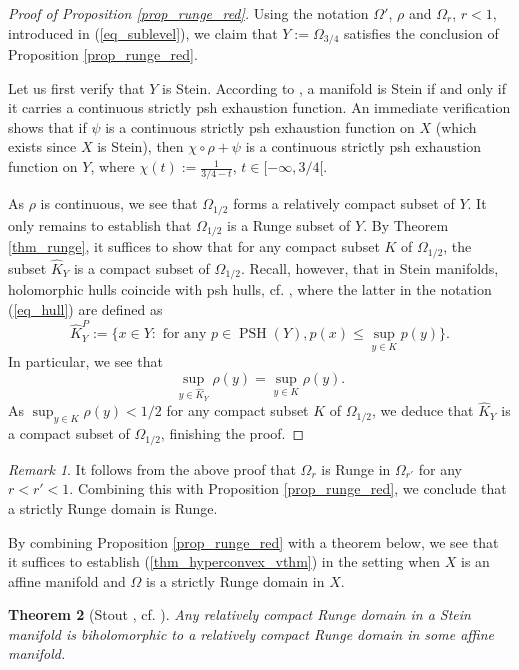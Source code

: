 \documentclass[12pt]{article}
\numberwithin{equation}{section}
\theoremstyle{theorem}
\newtheorem{thm}{Theorem}[section]
\theoremstyle{definition}
\theoremstyle{remark}
\newtheorem{rem}[thm]{Remark}
\newcommand{\psh}{\operatorname{PSH}}
\begin{document}
	\begin{proof}[Proof of Proposition \ref{prop_runge_red}]
		Using the notation $\Omega'$, $\rho$ and $\Omega_r$, $r < 1$, introduced in (\ref{eq_sublevel}), we claim that $Y := \Omega_{3/4}$ satisfies the conclusion of Proposition \ref{prop_runge_red}.
		\par 
		Let us first verify that $Y$ is Stein.
		According to \cite[Theorem II]{NarasimhLevi2}, a manifold is Stein if and only if it carries a continuous strictly psh exhaustion function.
		An immediate verification shows that if $\psi$ is a continuous strictly psh exhaustion function on $X$ (which exists since $X$ is Stein), then $\chi \circ \rho + \psi$ is a continuous strictly psh exhaustion function on $Y$, where $\chi(t) := \frac{1}{3/4 - t}$, $t \in [-\infty, 3/4[$.
		\par 
		As $\rho$ is continuous, we see that $\Omega_{1/2}$ forms a relatively compact subset of $Y$.
		It only remains to establish that $\Omega_{1/2}$ is a Runge subset of $Y$.
		By Theorem \ref{thm_runge}, it suffices to show that for any compact subset $K$ of $\Omega_{1/2}$, the subset $\widehat{K}_Y$ is a compact subset of $\Omega_{1/2}$.
		Recall, however, that in Stein manifolds, holomorphic hulls coincide with psh hulls, cf.  \cite[Theorems 4.3.4, 5.1.6]{Hormander}, where the latter in the notation (\ref{eq_hull}) are defined as 
		\begin{equation}\label{eq_hull_psh}
			\widehat{K}_Y^P
			:=
			\Big\{
				x \in Y : \text{ for any } p \in \psh(Y), p(x) \leq \sup_{y \in K} p(y)
			\Big\}.
		\end{equation}
		In particular, we see that 
		\begin{equation}
			\sup_{y \in \widehat{K}_Y} \rho(y) = \sup_{y \in K} \rho(y).
		\end{equation}
		As $\sup_{y \in K} \rho(y) < 1/2$ for any compact subset $K$ of $\Omega_{1/2}$, we deduce that $\widehat{K}_Y$ is a compact subset of $\Omega_{1/2}$, finishing the proof.
	\end{proof}
	\begin{rem}\label{eq_runge_dom_emb}
		It follows from the above proof that $\Omega_r$ is Runge in $\Omega_{r'}$ for any $r < r' < 1$.
		Combining this with Proposition \ref{prop_runge_red}, we conclude that a strictly Runge domain is Runge.
	\end{rem}
	\par 
	By combining Proposition \ref{prop_runge_red} with a theorem below, we see that it suffices to establish (\ref{thm_hyperconvex_vthm}) in the setting when $X$ is an affine manifold and $\Omega$ is a strictly Runge domain in $X$.
	\begin{thm}[{Stout \cite{StoutStein}, cf. \cite[Theorem 1.6]{DemLempShiff}}]\label{thm_stout}
		Any relatively compact Runge domain in a Stein manifold is biholomorphic to a relatively compact Runge domain in some affine manifold.
	\end{thm}
	
\end{document}
